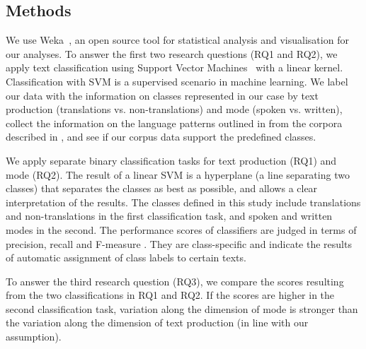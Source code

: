 \documentclass[output=paper,colorlinks,citecolor=brown]{langscibook}
\begin{document}
\subsection{Methods}\label{ssec:methods}
We use Weka~\citep{WittenEtAl2011}, an open
source tool for statistical analysis and visualisation for our analyses. To answer the first two research questions (RQ1 and RQ2), we apply text classification using Support Vector Machines~\citep[SVM,][]{VapnikChervonenkis1974,Joachims1998} with a linear kernel. Classification with SVM is a supervised scenario in machine learning. We label our data with the information on classes represented in our case by text production (translations vs. non-translations) and mode (spoken vs. written), collect the information on the language patterns outlined in  from the corpora described in , and see if our corpus data support the predefined classes.

We apply separate binary classification tasks for text production (RQ1)  and mode (RQ2). The result of a linear SVM is a hyperplane (a line separating two classes) that separates the classes as best as possible, and allows a clear interpretation of the results. The classes defined in this study include translations and non-translations in the first classification task, and spoken and written modes in the second. The
performance scores of classifiers are judged in terms of precision, recall and F-measure%
. They are class-specific and indicate the results of automatic assignment of class labels to certain texts.

To answer the third research question (RQ3), we compare the scores resulting from the two classifications in RQ1 and RQ2. If the scores are higher in the second classification task, %
variation along the dimension of mode is stronger than the variation along the dimension of text production (in line with our assumption).
\end{document}
